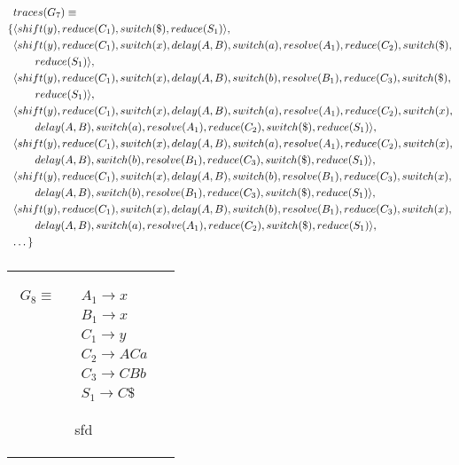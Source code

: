 \documentclass[11pt]{article}
\begin{document}
\parbox{.3\textwidth}{\begin{align*}
&traces(G_7) \equiv \\
\{ & \langle shift(y), reduce(C_1), switch(\$), reduce(S_1) \rangle,\\
   & \langle shift(y), reduce(C_1), switch(x), delay(A,B), switch(a), resolve(A_1), reduce(C_2), switch(\$), \\&\qquad reduce(S_1) \rangle,\\
   & \langle shift(y), reduce(C_1), switch(x), delay(A,B), switch(b), resolve(B_1), reduce(C_3), switch(\$), \\&\qquad reduce(S_1) \rangle,\\
   & \langle shift(y), reduce(C_1), switch(x), delay(A,B), switch(a), resolve(A_1), reduce(C_2), switch(x), \\&\qquad delay(A,B), switch(a), resolve(A_1), reduce(C_2), switch(\$), reduce(S_1) \rangle,\\
   & \langle shift(y), reduce(C_1), switch(x), delay(A,B), switch(a), resolve(A_1), reduce(C_2), switch(x), \\&\qquad delay(A,B), switch(b), resolve(B_1), reduce(C_3), switch(\$), reduce(S_1) \rangle,\\
   & \langle shift(y), reduce(C_1), switch(x), delay(A,B), switch(b), resolve(B_1), reduce(C_3), switch(x), \\&\qquad delay(A,B), switch(b), resolve(B_1), reduce(C_3), switch(\$), reduce(S_1) \rangle,\\
   & \langle shift(y), reduce(C_1), switch(x), delay(A,B), switch(b), resolve(B_1), reduce(C_3), switch(x), \\&\qquad delay(A,B), switch(a), resolve(A_1), reduce(C_2), switch(\$), reduce(S_1) \rangle,\\
   & \textellipsis \}
\end{align*}}

\subsubsection{}
\begin{tabular}[t]{cl}
\parbox{.3\textwidth}{
\begin{align*}
G_8 \equiv \quad & A_1 \rightarrow x\\
                 & B_1 \rightarrow x\\
                 & C_1 \rightarrow y\\
                 & C_2 \rightarrow A C a\\
                 & C_3 \rightarrow C B b\\
                 & S_1 \rightarrow C \$
\end{align*}}
\parbox{.8\textwidth}{sfd}
\end{tabular}
\end{document}
